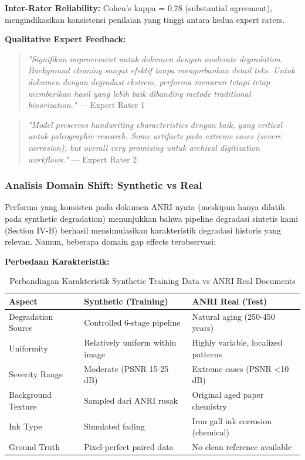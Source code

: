 \textbf{Inter-Rater Reliability:} Cohen's kappa = 0.78 (substantial agreement), mengindikasikan konsistensi penilaian yang tinggi antara kedua expert raters.

\textbf{Qualitative Expert Feedback:}
\begin{quote}
\textit{"Signifikan improvement untuk dokumen dengan moderate degradation. Background cleaning sangat efektif tanpa mengorbankan detail teks. Untuk dokumen dengan degradasi ekstrem, performa menurun tetapi tetap memberikan hasil yang lebih baik dibanding metode traditional binarization."} — Expert Rater 1
\end{quote}

\begin{quote}
\textit{"Model preserves handwriting characteristics dengan baik, yang critical untuk paleographic research. Some artifacts pada extreme cases (severe corrosion), but overall very promising untuk archival digitization workflows."} — Expert Rater 2
\end{quote}

\subsubsection{Analisis Domain Shift: Synthetic vs Real}

Performa yang konsisten pada dokumen ANRI nyata (meskipun hanya dilatih pada synthetic degradation) menunjukkan bahwa pipeline degradasi sintetis kami (Section IV-B) berhasil mensimulasikan karakteristik degradasi historis yang relevan. Namun, beberapa domain gap effects terobservasi:

\textbf{Perbedaan Karakteristik:}

\begin{table}[!t]
\renewcommand{\arraystretch}{1.2}
\caption{Perbandingan Karakteristik Synthetic Training Data vs ANRI Real Documents}
\label{table:synthetic_vs_real_comparison}
\centering
\small
\begin{tabular}{|p{3.5cm}|p{4cm}|p{4cm}|}
\hline
\textbf{Aspect} & \textbf{Synthetic (Training)} & \textbf{ANRI Real (Test)} \\
\hline
Degradation Source & Controlled 6-stage pipeline & Natural aging (250-450 years) \\
\hline
Uniformity & Relatively uniform within image & Highly variable, localized patterns \\
\hline
Severity Range & Moderate (PSNR 15-25 dB) & Extreme cases (PSNR <10 dB) \\
\hline
Background Texture & Sampled dari ANRI rusak & Original aged paper chemistry \\
\hline
Ink Type & Simulated fading & Iron gall ink corrosion (chemical) \\
\hline
Ground Truth & Pixel-perfect paired data & No clean reference available \\
\hline
\end{tabular}
\end{table}

